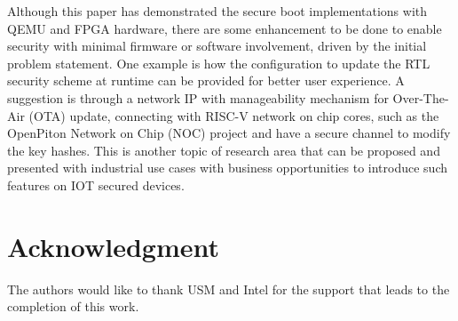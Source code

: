 \documentclass[a4paper,fleqn]{cas-dc}
\begin{document}
Although this paper has demonstrated the secure boot implementations with QEMU and FPGA hardware, there are some enhancement to be done to enable security with minimal firmware or software involvement, driven by the initial problem statement. One example is how the configuration to update the RTL security scheme at runtime can be provided for better user experience. A suggestion is through a network IP with manageability mechanism for Over-The-Air (OTA) update, connecting with RISC-V network on chip cores, such as the OpenPiton Network on Chip (NOC) project and have a secure channel to modify the key hashes. This is another topic of research area that can be proposed and presented with industrial use cases with business opportunities to introduce such features on IOT secured devices.

\section*{Acknowledgment}
The authors would like to thank USM and Intel for the support that leads to the completion of this work.

 


\vskip6pt
\end{document}
